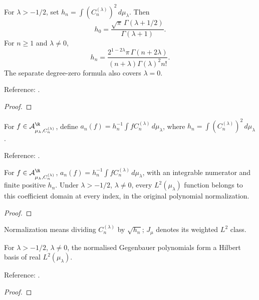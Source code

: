 \begin{theorem}
\label{thm:gegenbauer-norm}
\leanok
For $\lambda>-1/2$, set $h_n=\int(C_n^{(\lambda)})^2\,d\mu_\lambda$. Then
\[h_0=\frac{\sqrt\pi\,\Gamma(\lambda+1/2)}{\Gamma(\lambda+1)}.\]
For $n\ge1$ and $\lambda\ne0$,
\[h_n=\frac{2^{1-2\lambda}\pi\,\Gamma(n+2\lambda)}
 {(n+\lambda)\Gamma(\lambda)^2n!}.\]
The separate degree-zero formula also covers $\lambda=0$.

Reference: \cite[Table 18.3.1]{dlmf}.
\end{theorem}
\begin{proof}
\leanok
\end{proof}

\begin{definition}
\label{def:gegenbauer-coefficients}
\leanok
For $f\in\mathcal A_{\mu_\lambda,C_n^{(\lambda)}}^{\R}$, define $a_n(f)=h_n^{-1}\int fC_n^{(\lambda)}\,d\mu_\lambda$, where
$h_n=\int(C_n^{(\lambda)})^2\,d\mu_\lambda$.

Reference: \cite[18.2(viii)]{dlmf}.
\end{definition}

\begin{theorem}
\label{thm:gegenbauer-coefficient-characterisation}
\leanok
For $f\in\mathcal A_{\mu_\lambda,C_n^{(\lambda)}}^{\R}$, $a_n(f)=h_n^{-1}\int fC_n^{(\lambda)}\,d\mu_\lambda$, with an integrable numerator
and finite positive $h_n$. Under $\lambda>-1/2$, $\lambda\ne0$, every $L^2(\mu_\lambda)$ function belongs to this coefficient domain at every index, in the original polynomial normalization.
\end{theorem}
\begin{proof}
\leanok
\end{proof}

Normalization means dividing $C_n^{(\lambda)}$ by $\sqrt{h_n}$; $J_\mu$ denotes its weighted $L^2$ class.

\begin{theorem}
\label{thm:gegenbauer-basis}
\leanok
For $\lambda>-1/2$, $\lambda\ne0$, the normalised Gegenbauer polynomials
form a Hilbert basis of real $L^2(\mu_\lambda)$.

Reference: \cite[18.2(viii)]{dlmf}.
\end{theorem}
\begin{proof}
\leanok
\end{proof}


